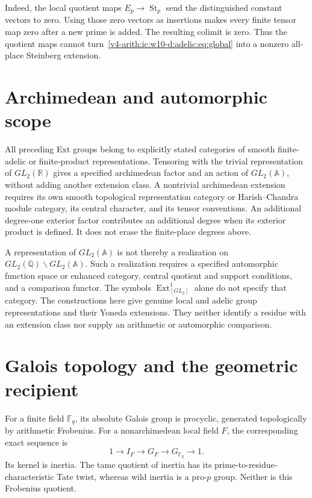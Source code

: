 Indeed, the local quotient maps $E_p\to\operatorname{St}_p$ send the distinguished
constant vectors to zero. Using those zero vectors as insertions makes every finite
tensor map zero after a new prime is added.
The resulting colimit is zero.
Thus the quotient maps cannot turn~\eqref{v4-arith:ic:w10-d:adelic:eq:global} into a nonzero
all-place Steinberg extension.

\section{Archimedean and automorphic scope}

All preceding Ext groups belong to explicitly stated categories of
smooth finite-adelic or finite-product representations. Tensoring with
the trivial representation of $GL_2(\mathbb R)$ gives a specified
archimedean factor and an action of $GL_2(\mathbb A)$, without adding another
extension class. A nontrivial archimedean extension requires its own
smooth topological representation category or Harish--Chandra module
category, its central character, and its tensor conventions. An
additional degree-one exterior factor contributes an additional degree
when its exterior product is defined. It does not erase the finite-place
degrees above.

A representation of $GL_2(\mathbb A)$ is not thereby a realization on
$GL_2(\mathbb Q)\backslash GL_2(\mathbb A)$. Such a realization requires a specified
automorphic function space or enhanced category, central quotient and
support conditions, and a comparison functor. The symbols
$\operatorname{Ext}^1_{[GL_2]}$ alone do not specify that category. The constructions
here give genuine local and adelic group representations and their
Yoneda extensions. They neither identify a residue with an extension
class nor supply an arithmetic or automorphic comparison.



\section{Galois topology and the geometric recipient}
\label{v4-arith:ic:topology}

For a finite field \(\mathbb F_q\), its absolute Galois group is
procyclic, generated topologically by arithmetic Frobenius.
For a nonarchimedean local field \(F\), the corresponding exact
sequence is
\[
 1\longrightarrow I_F\longrightarrow G_F
   \longrightarrow G_{\mathbb F_q}\longrightarrow1.
\]
Its kernel is inertia. The tame quotient of inertia has its
prime-to-residue-characteristic Tate twist, whereas wild inertia
is a pro-\(p\) group. Neither is this Frobenius quotient.

